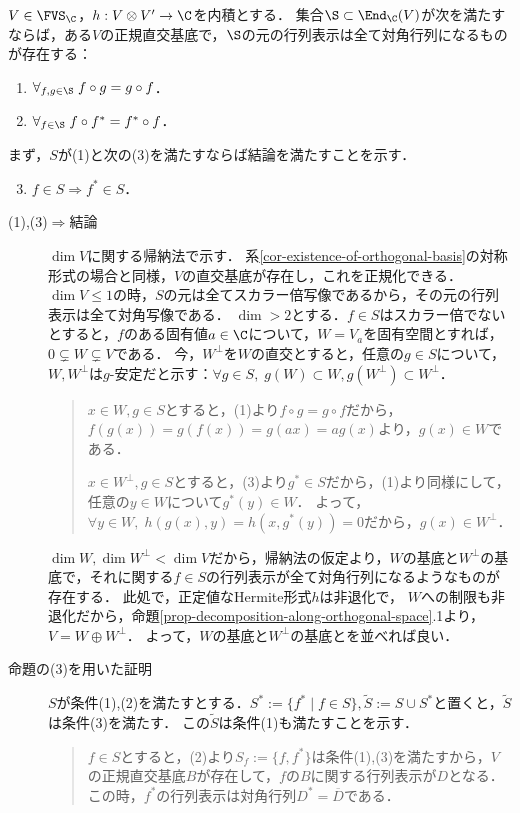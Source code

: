 \documentclass[uplatex, dvipdfmx]{jsreport}
\begin{document}
\begin{theorem}
    $V\in\FVS_\C$，$h:V\otimes V'\to\C$を内積とする．
    集合$\S\subset\End_\C(V)$が次を満たすならば，ある$V$の正規直交基底で，$\S$の元の行列表示は全て対角行列になるものが存在する：
    \begin{enumerate}
        \item $\forall_{f,g\in\S}\;f\circ g=g\circ f$．
        \item $\forall_{f\in\S}\;f\circ f^*=f^*\circ f$．
    \end{enumerate}
\end{theorem}
\begin{Proof}まず，$S$が(1)と次の(3)を満たすならば結論を満たすことを示す．
    \begin{enumerate}[(1)]\setcounter{enumi}{2}
        \item $f\in S\Rightarrow f^*\in S$．
    \end{enumerate}
    \begin{description}
        \item[(1),(3)$\Rightarrow$結論] 
        $\dim V$に関する帰納法で示す．
        系\ref{cor-existence-of-orthogonal-basis}の対称形式の場合と同様，$V$の直交基底が存在し，これを正規化できる．
        $\dim V\le 1$の時，$S$の元は全てスカラー倍写像であるから，その元の行列表示は全て対角写像である．
        $\dim >2$とする．$f\in S$はスカラー倍でないとすると，$f$のある固有値$a\in\C$について，$W=V_a$を固有空間とすれば，$0\subsetneq W\subsetneq V$である．
        今，$W^\perp$を$W$の直交とすると，任意の$g\in S$について，$W,W^\perp$は$g$-安定だと示す：$\forall g\in S,\;g(W)\subset W,g(W^\perp)\subset W^\perp$．
        \begin{quotation}
            $x\in W,g\in S$とすると，(1)より$f\circ g=g\circ f$だから，$f(g(x))=g(f(x))=g(ax)=ag(x)$より，$g(x)\in W$である．

            $x\in W^\perp,g\in S$とすると，(3)より$g^*\in S$だから，(1)より同様にして，任意の$y\in W$について$g^*(y)\in W$．
            よって，$\forall y\in W,\;h(g(x),y)=h(x,g^*(y))=0$だから，$g(x)\in W^\perp$．
        \end{quotation}
        $\dim W,\dim W^\perp<\dim V$だから，帰納法の仮定より，$W$の基底と$W^\perp$の基底で，それに関する$f\in S$の行列表示が全て対角行列になるようなものが存在する．
        此処で，正定値なHermite形式$h$は非退化で，
        $W$への制限も非退化だから，命題\ref{prop-decomposition-along-orthogonal-space}.1より，$V=W\oplus W^\perp$．
        よって，$W$の基底と$W^\perp$の基底とを並べれば良い．
        \item[命題の(3)を用いた証明]
        $S$が条件(1),(2)を満たすとする．$S^*:=\{f^*\mid f\in S\},\tilde{S}:=S\cup S^*$と置くと，$\tilde{S}$は条件(3)を満たす．
        この$\tilde{S}$は条件(1)も満たすことを示す．
        \begin{quotation}
            $f\in S$とすると，(2)より$S_f:=\{f,f^*\}$は条件(1),(3)を満たすから，$V$の正規直交基底$B$が存在して，$f$の$B$に関する行列表示が$D$となる．
            この時，$f^*$の行列表示は対角行列$D^*=\overline{D}$である．


\end{quotation}
\end{description}
\end{Proof}
\end{document}
